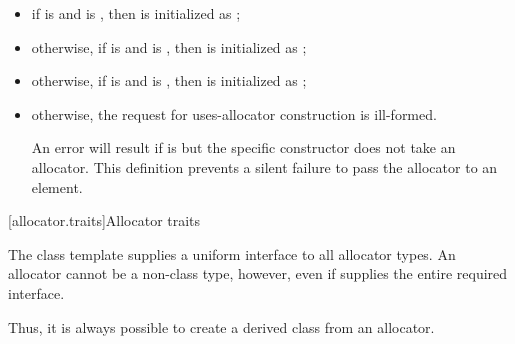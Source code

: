 \begin{itemize}
\item if  is  and
 is , then  is
initialized as ;

\item otherwise, if  is  and
  is
, then  is initialized as ;

\item otherwise, if  is  and
 is , then
 is initialized as ;

\item otherwise, the request for uses-allocator construction is ill-formed. \begin{note}
An error will result if  is  but the
specific constructor does not take an allocator. This definition prevents a silent
failure to pass the allocator to an element. \end{note}
\end{itemize}

[allocator.traits]{Allocator traits}

\pnum
The class template  supplies a uniform interface to all
allocator types.
An allocator cannot be a non-class type, however, even if 
supplies the entire required interface. \begin{note} Thus, it is always possible to create
a derived class from an allocator. \end{note}

